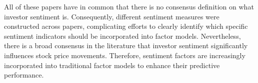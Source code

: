 All of these papers have in common that there is no consensus definition on what investor sentiment is. Consequently, different sentiment measures were constructed across papers, complicating efforts to clearly identify which specific sentiment indicators should be incorporated into factor models. Nevertheless, there is a broad consensus in the literature that investor sentiment significantly influences stock price movements. Therefore, sentiment factors are increasingly incorporated into traditional factor models to enhance their predictive performance.


